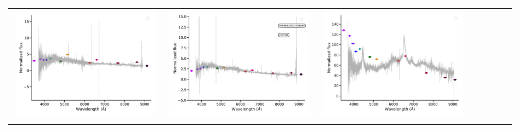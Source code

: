 \begin{center}
\begin{longtable}{l l l l l l }
    \includegraphics[width=0.3\linewidth, clip]{Figs/Figs-lamost/spec-58080-S82013N00M1_sp03-057-STRIPE82-0019-043090.pdf} & \includegraphics[width=0.3\linewidth, clip]{Figs/Figs-lamost/spec-58080-S82013N00M1_sp05-163-STRIPE82-0021-026890.pdf} & \includegraphics[width=0.3\linewidth, clip]{Figs/Figs-lamost/spec-58138-S82048N00B1_sp16-083-STRIPE82-0068-063428.pdf} \\
  \end{longtable}
\end{center}

